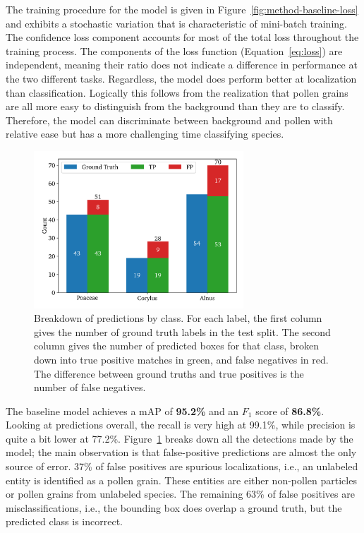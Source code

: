 The training procedure for the model is given in Figure~\ref{fig:method-baseline-loss} and exhibits a stochastic variation that is characteristic of mini-batch training.
The confidence loss component accounts for most of the total loss throughout the training process.
The components of the loss function (Equation~\ref{eq:loss}) are independent, meaning their ratio does not indicate a difference in performance at the two different tasks.
Regardless, the model does perform better at localization than classification.
Logically this follows from the realization that pollen grains are all more easy to distinguish from the background than they are to classify.
Therefore, the model can discriminate between background and pollen with relative ease but has a more challenging time classifying species.

\begin{figure}[htbp]
    \centering
    \includegraphics[width=0.7\textwidth]{figs/results/baseline/detections_test.pdf}
    \caption[Detections by type by class for the baseline on the test split]{%
Breakdown of predictions by class.
For each label, the first column gives the number of ground truth labels in the test split.
The second column gives the number of predicted boxes for that class, broken down into true positive matches in green, and false negatives in red.
The difference between ground truths and true positives is the number of false negatives.
    }\label{fig:results-baseline-detections}
  \end{figure}

The baseline model achieves a mAP of \textbf{95.2\%} and an \(F_1\) score of \textbf{86.8\%}.
Looking at predictions overall, the recall is very high at 99.1\%, while precision is quite a bit lower at 77.2\%.
Figure~\ref{fig:results-baseline-detections} breaks down all the detections made by the model;
the main observation is that false-positive predictions are almost the only source of error.
37\% of false positives are spurious localizations, i.e., an unlabeled entity is identified as a pollen grain.
These entities are either non-pollen particles or pollen grains from unlabeled species.
The remaining 63\% of false positives are misclassifications, i.e., the bounding box does overlap a ground truth, but the predicted class is incorrect.

